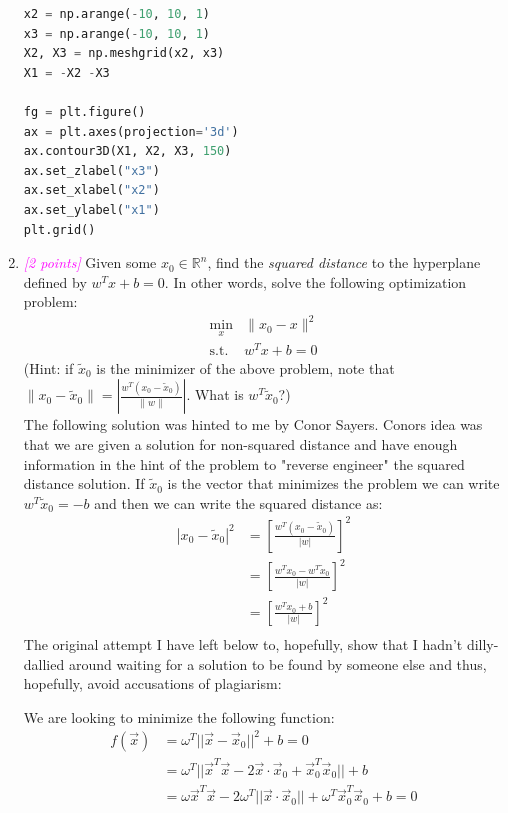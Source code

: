 \documentclass{article}
\newcommand{\field}[1]{\mathbb{#1}}
\newcommand{\1}{\mathbf{1}}
\newcommand{\R}{\field{R}} %
\newcommand{\points}[1]{\small\textcolor{magenta}{\emph{[#1 points]}} \normalsize}
\begin{document}
\begin{enumerate}
\begin{lstlisting}[language=Python]
x2 = np.arange(-10, 10, 1)
x3 = np.arange(-10, 10, 1)
X2, X3 = np.meshgrid(x2, x3)
X1 = -X2 -X3

fg = plt.figure()
ax = plt.axes(projection='3d')
ax.contour3D(X1, X2, X3, 150)
ax.set_zlabel("x3")
ax.set_xlabel("x2")
ax.set_ylabel("x1")
plt.grid()
    \end{lstlisting}

	\item \points{2} Given some $x_0 \in \R^n$, find the \emph{squared distance} to the hyperplane defined by $w^T x + b=0$. In other words, solve the following optimization problem:
	\begin{align*}
	\min_x& \|x_0 - x \|^2\\
	\text{s.t. }&w^Tx +b = 0
	\end{align*}
	(Hint: if $\widetilde{x}_0$ is the minimizer of the above problem, note that $\| x_0 - \widetilde{x}_0 \| = | \frac{w^T(x_0 - \widetilde{x}_0)}{\|w\|} |$. What is $w^T \widetilde{x}_0$?) \\
	The following solution was hinted to me by Conor Sayers. Conors idea was that we are given a solution for non-squared distance and have enough information in the hint of the problem to "reverse engineer" the squared distance solution. If $\widetilde x_0$ is the vector that minimizes the problem we can write $w^T\widetilde x_0 = -b$ and then we can write the squared distance as:
    \begin{align*}
    |x_0 - \widetilde x_0|^2 & = \left[\frac{w^T(x_0 - \widetilde x_0)}{|w|}\right]^2 \\
    & = \left[\frac{w^Tx_0- w^T\widetilde x_0}{|w|}\right]^2 \\
    & = \left[\frac{w^Tx_0 + b}{|w|}\right]^2 \\
    \end{align*}
    The original attempt I have left below to, hopefully, show that I hadn't dilly-dallied around waiting for a solution to be found by someone else and thus, hopefully, avoid accusations of plagiarism:\\
    \begin{footnotesize}
    We are looking to minimize the following function: 
	\begin{align*}
	    f(\vec x) &= \omega^T||\vec x-\vec x_0||^2 + b = 0 \\
	    &= \omega^T||\vec x^T \vec x - 2\vec x\cdot \vec x_0 + \vec x_0^T \vec x_0|| + b \\
	    &= \omega\vec x^T \vec x - 2\omega^T||\vec x\cdot \vec x_0|| + \omega^T\vec x_0^T \vec x_0 + b = 0

\end{align*}
\end{footnotesize}
\end{enumerate}
\end{document}
